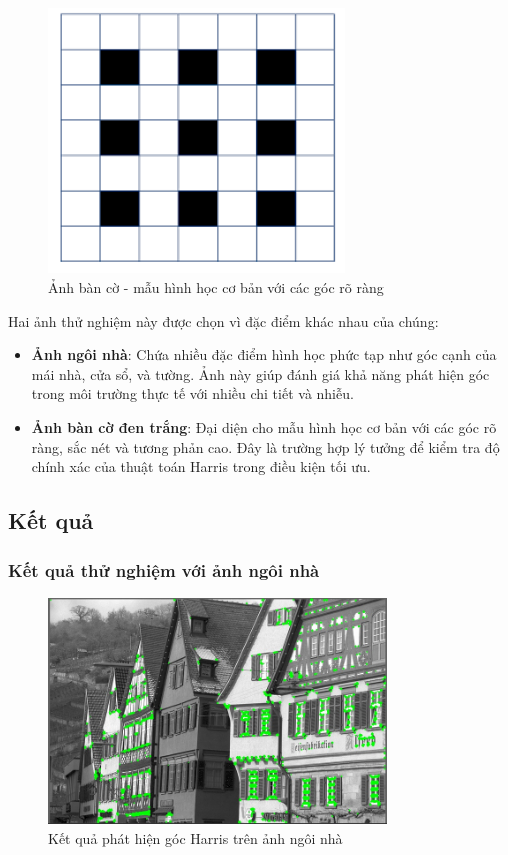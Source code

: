 \documentclass[12pt]{article}
\begin{document}
\begin{figure}[H]
    \centering
    \includegraphics[width=0.7\textwidth]{img/test2.jpg}
    \caption{Ảnh bàn cờ - mẫu hình học cơ bản với các góc rõ ràng}
    \label{fig:checkerboard}
\end{figure}

Hai ảnh thử nghiệm này được chọn vì đặc điểm khác nhau của chúng:
\begin{itemize}
    \item \textbf{Ảnh ngôi nhà}: Chứa nhiều đặc điểm hình học phức tạp như góc cạnh của mái nhà, cửa sổ, và tường. Ảnh này giúp đánh giá khả năng phát hiện góc trong môi trường thực tế với nhiều chi tiết và nhiễu.
    \item \textbf{Ảnh bàn cờ đen trắng}: Đại diện cho mẫu hình học cơ bản với các góc rõ ràng, sắc nét và tương phản cao. Đây là trường hợp lý tưởng để kiểm tra độ chính xác của thuật toán Harris trong điều kiện tối ưu.
\end{itemize}

\subsection{Kết quả}

\subsubsection{Kết quả thử nghiệm với ảnh ngôi nhà}

\begin{figure}[H]
    \centering
    \includegraphics[width=0.8\textwidth]{img/output1.jpg}
    \caption{Kết quả phát hiện góc Harris trên ảnh ngôi nhà}
    \label{fig:output1}
\end{figure}
\end{document}
